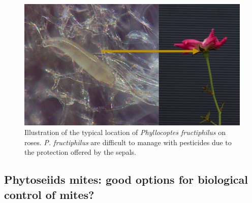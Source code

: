 \documentclass[12pt,final,CPage]{ufthesis}
\begin{document}
{\begin{figure}
  {\centering \includegraphics[width=0.8\linewidth]{figure/mite-pfruct-hide} 

  }

  \caption{Illustration of the typical location of \textit{Phyllocoptes fructiphilus} on roses. \textit{P. fructiphilus} are difficult to manage with pesticides due to the protection offered by the sepals.}\label{fig:hiding}
  \end{figure}
  \hypertarget{litrev-preds}{%
  \subsection{Phytoseiids mites: good options for biological control of mites?}\label{litrev-preds}}

}
\end{document}

